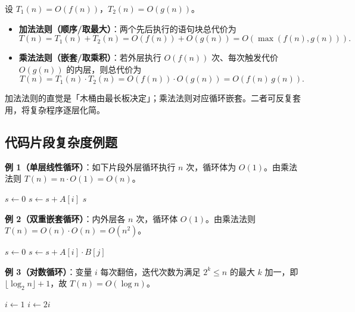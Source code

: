 设 $T_1(n)=O(f(n))$，$T_2(n)=O(g(n))$。

\begin{itemize}
    \item \textbf{加法法则（顺序/取最大）}：两个先后执行的语句块总代价为
    \begin{equation}
    T(n)=T_1(n)+T_2(n)=O(f(n))+O(g(n))=O(\max(f(n),g(n))).
    \end{equation}
    \item \textbf{乘法法则（嵌套/取乘积）}：若外层执行 $O(f(n))$ 次、每次触发代价 $O(g(n))$ 的内层，则总代价为
    \begin{equation}
    T(n)=T_1(n)\cdot T_2(n)=O(f(n))\cdot O(g(n))=O(f(n)\,g(n)).
    \end{equation}
\end{itemize}

加法法则的直觉是「木桶由最长板决定」；乘法法则对应循环嵌套。二者可反复套用，将复杂程序逐层化简。

\subsection{代码片段复杂度例题}

\textbf{例 1（单层线性循环）}：如下片段外层循环执行 $n$ 次，循环体为 $O(1)$。由乘法法则 $T(n)=n\cdot O(1)=O(n)$。

\begin{algorithm}[H]
\caption{单层循环求和}
\begin{algorithmic}[1]
\State $s \gets 0$
    \State $s \gets s + A[i]$
\EndFor
\State \Return $s$
\end{algorithmic}
\end{algorithm}

\textbf{例 2（双重嵌套循环）}：内外层各 $n$ 次，循环体 $O(1)$。由乘法法则 $T(n)=O(n)\cdot O(n)=O(n^2)$。

\begin{algorithm}[H]
\caption{双重嵌套循环}
\begin{algorithmic}[1]
\State $s \gets 0$
        \State $s \gets s + A[i]\cdot B[j]$
    \EndFor
\EndFor
\end{algorithmic}
\end{algorithm}

\textbf{例 3（对数循环）}：变量 $i$ 每次翻倍，迭代次数为满足 $2^k\le n$ 的最大 $k$ 加一，即 $\lfloor \log_2 n\rfloor+1$，故 $T(n)=O(\log n)$。

\begin{algorithm}[H]
\caption{倍增循环}
\begin{algorithmic}[1]
\State $i \gets 1$
    \State $i \gets 2i$
\EndWhile
\end{algorithmic}
\end{algorithm}

